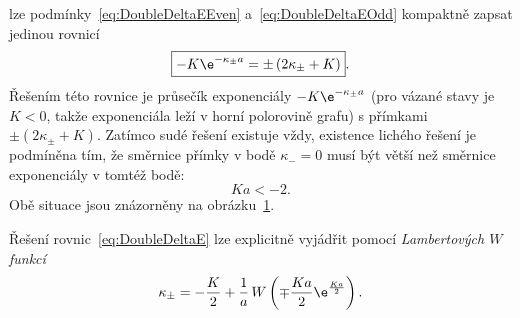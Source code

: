 \begin{solution}
\begin{enumerate}
\begin{equation}
		\end{equation}
		lze podmínky~\eqref{eq:DoubleDeltaEEven} a~\eqref{eq:DoubleDeltaEOdd} kompaktně zapsat jedinou rovnicí
		\begin{equation}\label{eq:DoubleDeltaE}
			\boxed{-K\e^{-\kappa_{\pm}a}=\pm\left(2\kappa_{\pm}+K\right)}.
		\end{equation}
		Řešením této rovnice je průsečík exponenciály $-K\e^{-\kappa{_{\pm}a}}$ (pro vázané stavy je $K<0$, takže exponenciála leží v horní polorovině grafu) s přímkami $\pm(2\kappa_{\pm}+K)$.
		Zatímco sudé řešení existuje vždy, existence lichého řešení je podmíněna tím, že směrnice přímky v bodě $\kappa_{-}=0$ musí být větší než směrnice exponenciály v tomtéž bodě:
		\begin{equation}
			\boxed{Ka<-2}.
		\end{equation}
		Obě situace jsou znázorněny na obrázku~\ref{fig:DoubleDeltaE}.
		
		\begin{figure}[!htbp]
            \begin{subfigure}{0.49\linewidth}
                \centering{}
            \end{subfigure}
            \hfill
            \begin{subfigure}{0.49\linewidth}
                \centering{}
            \end{subfigure}
    
			\label{fig:DoubleDeltaE}
		\end{figure}		
		
		Řešení rovnic~\eqref{eq:DoubleDeltaE} lze explicitně vyjádřit pomocí \emph{Lambertových $W$ funkcí}
		\begin{equation}
            \kappa_{\pm}
                =-\frac{K}{2}+\frac{1}{a}\,W\left(\mp\frac{Ka}{2}\e^{\frac{Ka}{2}}\right).
		\end{equation}
		

\end{enumerate}
\end{solution}
